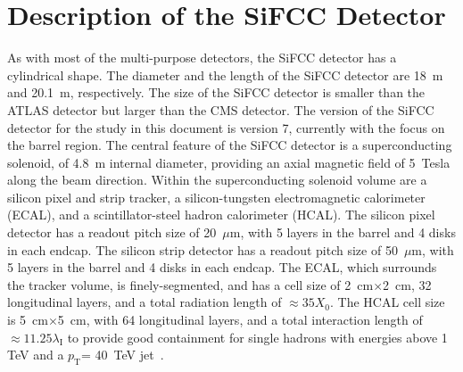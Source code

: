 \documentclass{PoS}
\newcommand{\pt}{\ensuremath{p_{\mathrm{T}}}}
\begin{document}
\section{Description of the SiFCC Detector} 
As with most of the multi-purpose detectors, the SiFCC detector has a 
cylindrical shape. The diameter and the length of the SiFCC detector are 18~m 
and 20.1~m, respectively. The size of 
the SiFCC detector is smaller than the ATLAS detector but  
larger than the CMS detector. 
The version of the SiFCC detector for the study in this document 
is version 7, currently with the focus on the barrel region.
%
The central feature of the SiFCC detector is a superconducting solenoid, 
of 4.8~m internal diameter, providing an axial magnetic field of 5~Tesla 
along the beam direction. Within the superconducting solenoid volume are 
a silicon pixel and strip tracker, a silicon-tungsten electromagnetic 
calorimeter (ECAL), and a scintillator-steel hadron calorimeter (HCAL). 
The silicon pixel detector has a readout pitch size of 20~$\mu$m, with
5 layers in the barrel and 4 disks in each endcap. 
The silicon strip detector has a readout pitch size of 50~$\mu$m, with 5 
layers in the barrel and 4 disks in each endcap.
 The ECAL, which surrounds the tracker volume, is finely-segmented, and 
 has a cell size of 2~cm$\times$2~cm, 32 longitudinal layers, and a 
total radiation length of $\approx 35 X_0$. The HCAL cell size is 
5~cm$\times$5~cm, with 64 longitudinal layers, and a total interaction 
length of $\approx 11.25 \lambda_{\mathrm I}$ to provide good containment 
for single hadrons with energies above 1 TeV and a \pt= 40~TeV 
jet~\cite{bitch}. 
\end{document}
